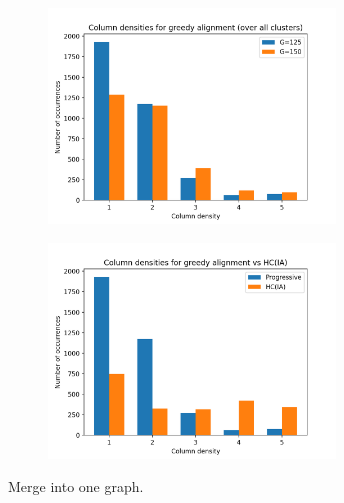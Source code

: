\documentclass{article}
\begin{document}
\begin{figure}
\begin{subfigure}{0.5\textwidth}
\centering
\includegraphics[width=3in]{img/prog125v150.png}
\caption{}
\end{subfigure}
\begin{subfigure}{0.5\textwidth}
\centering
\includegraphics[width=3in]{img/prog125vhcia}
\subcaption{}
\end{subfigure}
\caption{
\label{fig:colcounts}
Merge into one graph.
}
\end{figure}




\newpage


\end{document}

